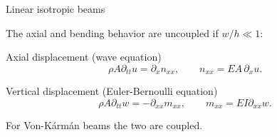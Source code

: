 \documentclass[serif]{beamer} %
\begin{document}
\begin{frame}{Linear isotropic beams}
	
	The axial and bending behavior are uncoupled if $w/h \ll 1$:
	
	\begin{block}{Axial displacement (wave equation)}
		\begin{equation*}
			\rho A \partial_{tt} u = \partial_x n_{xx}, \qquad n_{xx}=EA \, \partial_x u.
		\end{equation*}
	\end{block}
	
	\begin{block}{Vertical displacement (Euler-Bernoulli equation)}
		\begin{equation*}
			\rho A \partial_{tt} w = -\partial_{xx} m_{xx}, \qquad m_{xx} = EI \partial_{xx} w.
		\end{equation*}
	\end{block}
	For Von-K\'arm\'an beams the two are coupled.
\end{frame}
\end{document}
